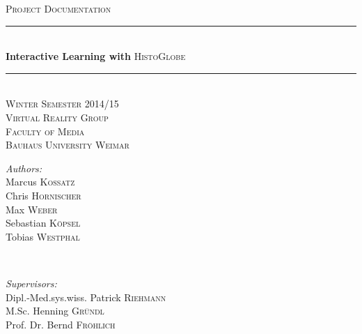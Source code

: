 \begin{titlepage}

\newcommand{\HRule}{\rule{\linewidth}{0.5mm}}

\center %

\textsc{\Large Project Documentation}\\[1.5cm] %

\HRule \\[0.7cm]
{ \huge \textbf{Interactive Learning with} \textsc{HistoGlobe}}\\[0.4cm] %
\HRule \\[3cm]

\textsc{\large Winter Semester 2014/15 } \\ [0.5cm]
\textsc{\large Virtual Reality Group } \\ [0.25cm]
\textsc{\large Faculty of Media } \\ [0.25cm]
\textsc{\large Bauhaus University Weimar}\\[3cm]


\begin{minipage}{0.4\textwidth}
\begin{flushleft} \large
\emph{Authors:}
\\Marcus \textsc{Kossatz}   %
\\Chris \textsc{Hornischer} %
\\Max \textsc{Weber}        %
\\Sebastian \textsc{Köpsel} %
\\Tobias \textsc{Westphal}  %
\end{flushleft}
\end{minipage}
~
\begin{minipage}{0.5\textwidth}
\begin{flushright} \large
\emph{Supervisors:}
\\Dipl.-Med.sys.wiss. Patrick \textsc{Riehmann}
\\M.Sc. Henning \textsc{Gründl}
\\Prof. Dr. Bernd \textsc{Fröhlich}
\end{flushright}
\end{minipage}\\[2cm]
~


\end{titlepage}
